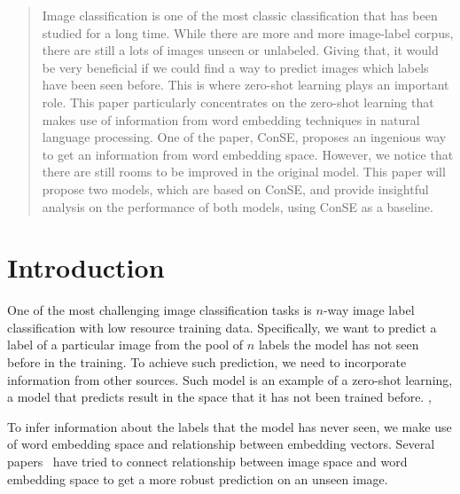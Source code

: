 \documentclass[11pt,letterpaper]{article}
\date{}
\begin{document}



\begin{abstract}
Image classification is one of the most classic classification that has been studied for a long time. While there are more and more image-label corpus, there are still a lots of images unseen or unlabeled. Giving that, it would be very beneficial if we could find a way to predict images which labels have been seen before. This is where zero-shot learning plays an important role. This paper particularly concentrates on the zero-shot learning that makes use of information from word embedding techniques in natural language processing. One of the paper, ConSE, proposes an ingenious way to get an information from word embedding space. However, we notice that there are still rooms to be improved in the original model. This paper will propose two models, which are based on ConSE, and provide insightful analysis on the performance of both models, using ConSE as a baseline.
\end{abstract}

\section{Introduction}
One of the most challenging image classification tasks is $n$-way image label classification with low resource training data. Specifically, we want to predict a label of a particular image from the pool of $n$ labels the model has not seen before in the training. To achieve such prediction, we need to incorporate information from other sources. Such model is an example of a zero-shot learning, a model that predicts result in the space that it has not been trained before. ,

To infer information about the labels that the model has never seen,  we make use of word embedding space and relationship between embedding vectors. Several papers~\cite{devise, cvpr, cross-modal} have tried to connect relationship between image space and word embedding space to get a more robust prediction on an unseen image. 
\end{document}
